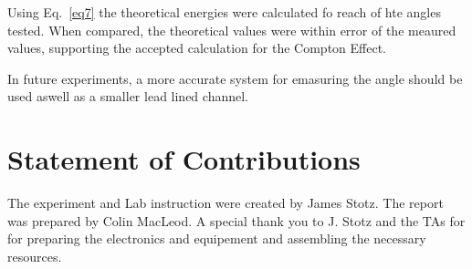 \documentclass[prb,preprint,groupaddress,showpacs,superbib,floats]{revtex4-1}
\begin{document}
Using Eq.~\ref{eq7} the theoretical energies were calculated fo reach of hte angles tested. When compared, the theoretical values were within error of the meaured values, supporting the accepted calculation for the Compton Effect.

In future experiments, a more accurate system for emasuring the angle should be used aswell as a smaller lead lined channel.


\section{Statement of Contributions}

The experiment and Lab instruction were created by James Stotz. The report was prepared by Colin MacLeod. A special thank you to J. Stotz and the TAs for for preparing the electronics and equipement and assembling the necessary resources.





\end{document}
